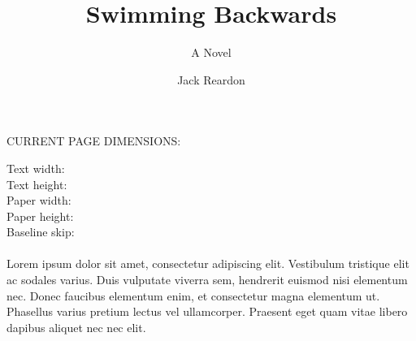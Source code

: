 \documentclass{scrbook}
\author{Jack Reardon}
\title{Swimming Backwards}
\subtitle{A Novel}
\begin{document}
\maketitle

\begin{center}\Large
\vspace*{2em}
CURRENT PAGE DIMENSIONS:
\medskip

Text width: \Convert[unit=in]{\the\textwidth}\\
Text height: \Convert[unit=in]{\the\textheight}\\
Paper width: \Convert[unit=in]{\the\paperwidth}\\
Paper height: \Convert[unit=in]{\the\paperheight}\\
Baseline skip: \\
\normalsize\the\baselineskip\\
Lorem ipsum dolor sit amet, consectetur adipiscing elit. Vestibulum tristique
elit ac sodales varius. Duis vulputate viverra sem, hendrerit euismod nisi 
elementum nec. Donec faucibus elementum enim, et consectetur magna elementum ut. 
Phasellus varius pretium lectus vel ullamcorper. Praesent eget quam vitae libero 
dapibus aliquet nec nec elit.
\end{center}

\tableofcontents
\titlemark


\end{document}
